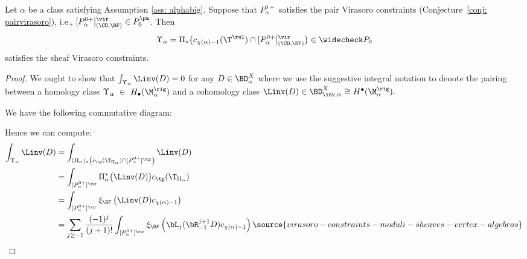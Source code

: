 \begin{theorem}
\notready\label{lem: projectivebundle}
Let $\alpha$ be a class satisfying Assumption \ref{ass: alphabig}. Suppose that $P^{0+}_\alpha$ satisfies the pair Virasoro constraints (Conjecture~\ref{conj: pairvirasoro}), i.e., $[P^{0+}_\alpha]^\vir_{(\CO, \BF)}\in P^{\pa}_{0}$. Then
\[\Upsilon_\alpha=\Pi_\ast\big(c_{\chi(\alpha)-1}(\T^{\rel})\cap [P^{0+}_\alpha]^\vir_{(\CO, \BF)}\big)\in \widecheck P_0\]
satisfies the sheaf Virasoro constraints.
\end{theorem}


\begin{proof}
We ought to show that $\int_{\Upsilon_\alpha}\Linv(D)=0$ for any $D\in \BD^X_{\alpha}$ where we use the suggestive integral notation to denote the pairing between a homology class $\Upsilon_\alpha~\in~H_\bullet(\M^\rig_\alpha)$ and a cohomology class $\Linv(D)\in \BD^X_{\inv, \alpha}\cong H^\bullet(\M^\rig_\alpha).$

We have the following commutative diagram:


Hence we can compute:
\begin{align}
\nonumber \int_{\Upsilon_\alpha}\Linv(D)&=\int_{(\Pi_\alpha)_\ast\left(c_{\tp}(\T_{\Pi_\alpha})\cap [P_\alpha^{0+}]^\vir\right)}\Linv(D)\\
\nonumber &
=\int_{[P_\alpha^{0+}]^\vir}\Pi^\ast_\alpha \big(\Linv(D)\big)c_{\tp}(\T_{\Pi_\alpha})\\
 &=\int_{[P_\alpha^{0+}]^\vir}\xi_\BF \left(\Linv(D)c_{\chi(\alpha)-1}\right)\nonumber\\
 &=\sum_{j\geq -1}\frac{(-1)^j}{(j+1)!}\int_{[P_\alpha^{0+}]^\vir}\xi_\BF \left(\bL_j(\bR_{-1}^{j+1}D)c_{\chi(\alpha)-1}\right)
 \label{eq: integralUpsilon}
\source{virasoro-constraints-moduli-sheaves-vertex-algebras}
\end{align}


\end{proof}
